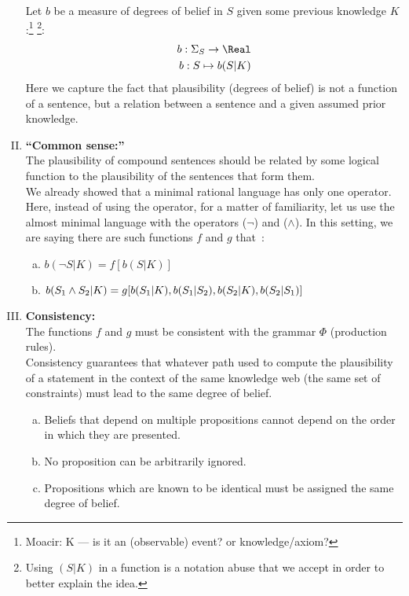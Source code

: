 \begin{enumerate}[I.]
	Let \(b\) be a measure of degrees of belief in \(S\) given some previous knowledge \(K\):\footnote{Moacir: K --- is it an (observable) event? or knowledge/axiom?}
	\footnote{Using \((S|K)\) in a function is a notation abuse that we accept in order to better explain the idea.}:
	\begin{align}
		b: \Sigma_S \to \Real\\
		b: S \mapsto b(S|K)
	\end{align}
	Here we capture the fact that plausibility (degrees of belief) is not a function of a sentence, but a relation between a sentence and a given assumed prior knowledge.
	\item \textbf{``Common sense:''}\\
	The plausibility of compound sentences should be related by some logical function to the plausibility of the sentences that form them. \\
	We already showed that a minimal rational language has only one operator. Here, instead of using the  operator, for a matter of familiarity, let us use the almost minimal language with the operators  (\(\neg\)) and  ($\land$). In this setting, we are saying there are such functions $f$ and $g$ that~\cite{sowinski:2016}:
	\begin{enumerate}[(a)]
		\item \(b(\neg S|K) = f[b(S|K)]\)
		\item \(b(S_1 \land S_2 | K) =\\g[b(S_1|K), b(S_1|S_2), b(S_2|K), b(S_2|S_1)]\)
	\end{enumerate}
	\item \textbf{Consistency:}\\
	The functions \(f\) and \(g\) must be consistent with the grammar \(\Phi\) (production rules).\\Consistency guarantees that whatever path used to compute the plausibility of a statement in the context of the same knowledge web (the same set of constraints) must lead to the same degree of belief.\label{consistency}
	\begin{enumerate}
		[(a)]
		\item Beliefs that depend on multiple propositions cannot depend on the order in which they are presented.\label{axiom:order}
		\item No proposition can be arbitrarily ignored.
		\item Propositions which are known to be identical must be assigned the same degree of belief.
	\end{enumerate}
\end{enumerate}

